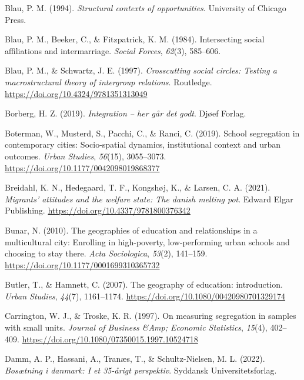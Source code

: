 \documentclass[
]{book}
\newlength{\cslhangindent}
\newenvironment{CSLReferences}[2] %
 {\begin{list}{}{%
  \setlength{\itemindent}{0pt}
  \setlength{\leftmargin}{0pt}
  \setlength{\parsep}{0pt}
  \ifodd #1
   \setlength{\leftmargin}{\cslhangindent}
   \setlength{\itemindent}{-1\cslhangindent}
  \fi
  \setlength{\itemsep}{#2\baselineskip}}}
 {\end{list}}
\begin{document}
\begin{CSLReferences}{1}{0}
Blau, P. M. (1994). \emph{Structural contexts of opportunities}. University of Chicago Press.

Blau, P. M., Beeker, C., \& Fitzpatrick, K. M. (1984). Intersecting social affiliations and intermarriage. \emph{Social Forces}, \emph{62}(3), 585--606.

Blau, P. M., \& Schwartz, J. E. (1997). \emph{Crosscutting social circles: Testing a macrostructural theory of intergroup relations}. Routledge. \url{https://doi.org/10.4324/9781351313049}

Borberg, H. Z. (2019). \emph{Integration -- her går det godt}. Djøef Forlag.

Boterman, W., Musterd, S., Pacchi, C., \& Ranci, C. (2019). School segregation in contemporary cities: Socio-spatial dynamics, institutional context and urban outcomes. \emph{Urban Studies}, \emph{56}(15), 3055--3073. \url{https://doi.org/10.1177/0042098019868377}

Breidahl, K. N., Hedegaard, T. F., Kongshøj, K., \& Larsen, C. A. (2021). \emph{Migrants' attitudes and the welfare state: The danish melting pot}. Edward Elgar Publishing. \url{https://doi.org/10.4337/9781800376342}

Bunar, N. (2010). The geographies of education and relationships in a multicultural city: Enrolling in high-poverty, low-performing urban schools and choosing to stay there. \emph{Acta Sociologica}, \emph{53}(2), 141--159. \url{https://doi.org/10.1177/0001699310365732}

Butler, T., \& Hamnett, C. (2007). The geography of education: introduction. \emph{Urban Studies}, \emph{44}(7), 1161--1174. \url{https://doi.org/10.1080/00420980701329174}

Carrington, W. J., \& Troske, K. R. (1997). On measuring segregation in samples with small units. \emph{Journal of Business \&Amp; Economic Statistics}, \emph{15}(4), 402--409. \url{https://doi.org/10.1080/07350015.1997.10524718}

Damm, A. P., Hassani, A., Tranæs, T., \& Schultz-Nielsen, M. L. (2022). \emph{Bosætning i danmark: I et 35-årigt perspektiv}. Syddansk Universitetsforlag.


\end{CSLReferences}
\end{document}
